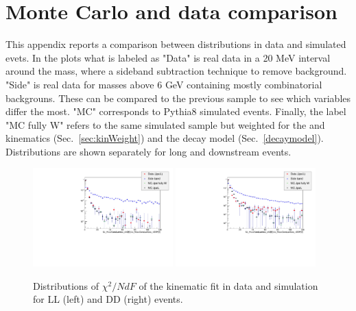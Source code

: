 \chapter{Monte Carlo and data comparison}
\label{app:MC_data_comp}

This appendix reports a comparison between distributions in data and simulated \Lb\to\jpsi\Lz evets.
%
In the plots what is labeled as "Data" is real data in a 20 MeV interval around the \Lb mass,
where a sideband subtraction technique to remove background. "Side" is real data for masses
above 6 GeV containing mostly combinatorial backgrouns. These can be compared to the previous
sample to see which variables differ the most.
"MC" corresponds to Pythia8 \Lb\to\jpsi\Lz simulated events. %
Finally, the label "MC fully W" refers to the same simulated sample but weighted for the
\Lb and \Lz kinematics (Sec.~\ref{sec:kinWeight}) and the decay model (Sec.~\ref{decaymodel}).
Distributions are shown separately for long and downstream events.


\begin{figure}[h!]
\centering
\includegraphics[width=0.48\textwidth]{Lmumu/figs/MC_data_comp/Lb_MassConsLambda_chi20Lb_MassConsLambda_nDOF0_plotLL.pdf}
\includegraphics[width=0.48\textwidth]{Lmumu/figs/MC_data_comp/Lb_MassConsLambda_chi20Lb_MassConsLambda_nDOF0_plotDD.pdf}
\caption{ Distributions of $\chi^2/NdF$ of the kinematic fit in data and simulation for LL (left) and DD (right) events.   }
\end{figure}


